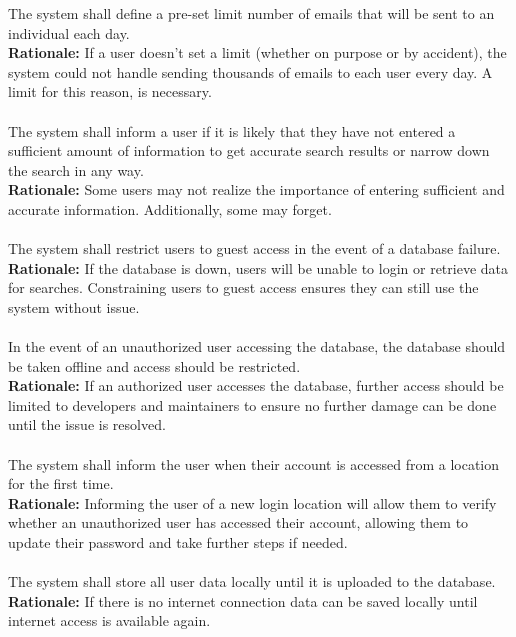 \documentclass{article}
\begin{document}
The system shall define a pre-set limit number of emails that will be sent to an individual each day.\\
\textbf{Rationale:}
If a user doesn't set a limit (whether on purpose or by accident), the system could not handle sending thousands of emails to each user every day. A limit for this reason, is necessary.\\~\\

The system shall inform a user if it is likely that they have not entered a sufficient amount of information to get accurate search results or narrow down the search in any way.\\
\textbf{Rationale:}
Some users may not realize the importance of entering sufficient and accurate information. Additionally, some may forget.\\~\\

The system shall restrict users to guest access in the event of a database failure.\\
\textbf{Rationale:}
If the database is down, users will be unable to login or retrieve data for searches. Constraining users to guest access ensures they can still use the system without issue.\\~\\

In the event of an unauthorized user accessing the database, the database should be taken offline and access should be restricted.\\
\textbf{Rationale:}
If an authorized user accesses the database, further access should be limited to developers and maintainers to ensure no further damage can be done until the issue is resolved.\\~\\

The system shall inform the user when their account is accessed from a location for the first time. \\
\textbf{Rationale:}
Informing the user of a new login location will allow them to verify whether an unauthorized user has accessed their account, allowing them to update their password and take further steps if needed. \\~\\

The system shall store all user data locally until it is uploaded to the database. \\
\textbf{Rationale:}
If there is no internet connection data can be saved locally until internet access is available again.\\~\\
\end{document}
